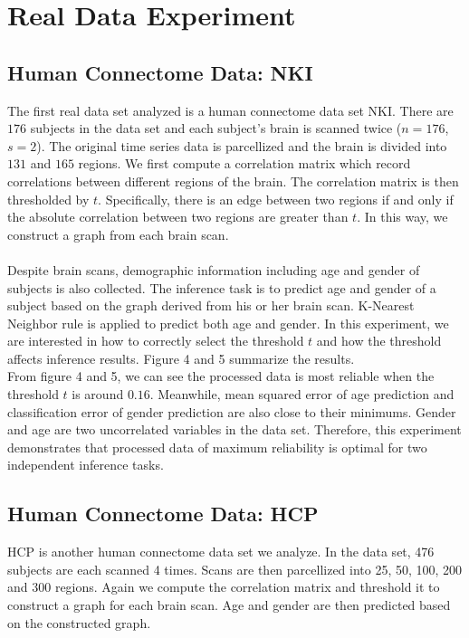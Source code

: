 \documentclass{article}
\begin{document}
\section{Real Data Experiment}
\subsection{Human Connectome Data: NKI}
The first real data set analyzed is a human connectome data set NKI. There are $176$ subjects in the data set and each subject's brain is scanned twice ($n=176$, $s=2$). The original time series data is parcellized and the brain is divided into $131$ and $165$ regions. We first compute a correlation matrix which record correlations between different regions of the brain. The correlation matrix is then thresholded by $t$. Specifically, there is an edge between two regions if and only if the absolute correlation between two regions are greater than $t$. In this way, we construct a graph from each brain scan.\\ 
\\
Despite brain scans, demographic information including age and gender of subjects is also collected. The inference task is to predict age and gender of a subject based on the graph derived from his or her brain scan. K-Nearest Neighbor rule is applied to predict both age and gender. In this experiment, we are interested in how to correctly select the threshold $t$ and how the threshold affects inference results. Figure 4 and 5 summarize the results.\\



\noindent From figure 4 and 5, we can see the processed data is most reliable when the threshold $t$ is around $0.16$. Meanwhile, mean squared error of age prediction and classification error of gender prediction are also close to their minimums. Gender and age are two uncorrelated variables in the data set. Therefore, this experiment demonstrates that processed data of maximum reliability is optimal for two independent inference tasks. 

\subsection{Human Connectome Data: HCP}
HCP is another human connectome data set we analyze. In the data set, 476 subjects are each scanned 4 times. Scans are then parcellized into 25, 50, 100, 200 and 300 regions. Again we compute the correlation matrix and threshold it to construct a graph for each brain scan. Age and gender are then predicted based on the constructed graph.\\
\end{document}

